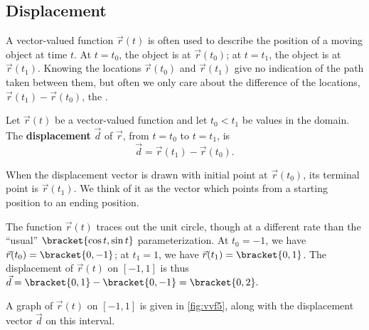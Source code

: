 \subsection{Displacement}

A vector-valued function $\vec r(t)$ is often used to describe the position of a moving object at time $t$. At $t=t_0$, the object is at $\vec r(t_0)$; at $t=t_1$, the object is at $\vec r(t_1)$. Knowing the locations $\vec r(t_0)$ and $\vec r(t_1)$ give no indication of the path taken between them, but often we only care about the difference of the locations, $\vec r(t_1)-\vec r(t_0)$, the .

{Let $\vec r(t)$ be a vector-valued function and let $t_0<t_1$ be values in the domain. The \textbf{displacement} $\vec d$ of $\vec r$, from $t=t_0$ to $t=t_1$, is \[\vec d=\vec r(t_1)-\vec r(t_0).\]}

When the displacement vector is drawn with initial point at $\vec r(t_0)$, its terminal point is $\vec r(t_1)$. We think of it as the vector which points from a starting position to an ending position.

{The function $\vec r(t)$ traces out the unit circle, though at a different rate than the ``usual'' $\bracket{\cos t,\sin t}$ parameterization. At $t_0=-1$, we have $\vec r(t_0) =\bracket{0,-1}$; at $t_1=1$, we have $\vec r(t_1) =\bracket{0,1}$. The displacement of $\vec r(t)$ on $[-1,1]$ is thus $\vec d =\bracket{0,1}-\bracket{0,-1}=\bracket{0,2}.$


A graph of $\vec r(t)$ on $[-1,1]$ is given in \autoref{fig:vvf5}, along with the displacement vector $\vec d$ on this interval.}


